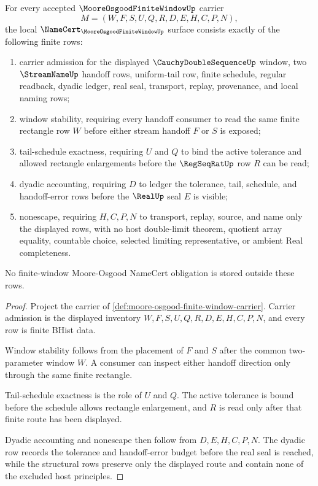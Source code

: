 \begin{theorem}\label{thm:moore-osgood-finite-window-namecert-obligations}
For every accepted $\MooreOsgoodFiniteWindowUp$ carrier
$$
M=(W,F,S,U,Q,R,D,E,H,C,P,N),
$$
the local $\NameCert_{\MooreOsgoodFiniteWindowUp}$ surface consists exactly of the following finite rows:
\begin{enumerate}
\item carrier admission for the displayed $\CauchyDoubleSequenceUp$ window, two $\StreamNameUp$ handoff rows, uniform-tail row, finite schedule, regular readback, dyadic ledger, real seal, transport, replay, provenance, and local naming rows;
\item window stability, requiring every handoff consumer to read the same finite rectangle row $W$ before either stream handoff $F$ or $S$ is exposed;
\item tail-schedule exactness, requiring $U$ and $Q$ to bind the active tolerance and allowed rectangle enlargements before the $\RegSeqRatUp$ row $R$ can be read;
\item dyadic accounting, requiring $D$ to ledger the tolerance, tail, schedule, and handoff-error rows before the $\RealUp$ seal $E$ is visible;
\item nonescape, requiring $H,C,P,N$ to transport, replay, source, and name only the displayed rows, with no host double-limit theorem, quotient array equality, countable choice, selected limiting representative, or ambient Real completeness.
\end{enumerate}
No finite-window Moore-Osgood NameCert obligation is stored outside these rows.
\end{theorem}
\begin{proof}
Project the carrier of \autoref{def:moore-osgood-finite-window-carrier}. Carrier admission is the displayed inventory $W,F,S,U,Q,R,D,E,H,C,P,N$, and every row is finite BHist data.

Window stability follows from the placement of $F$ and $S$ after the common two-parameter window $W$. A consumer can inspect either handoff direction only through the same finite rectangle.

Tail-schedule exactness is the role of $U$ and $Q$. The active tolerance is bound before the schedule allows rectangle enlargement, and $R$ is read only after that finite route has been displayed.

Dyadic accounting and nonescape then follow from $D,E,H,C,P,N$. The dyadic row records the tolerance and handoff-error budget before the real seal is reached, while the structural rows preserve only the displayed route and contain none of the excluded host principles.
\end{proof}

